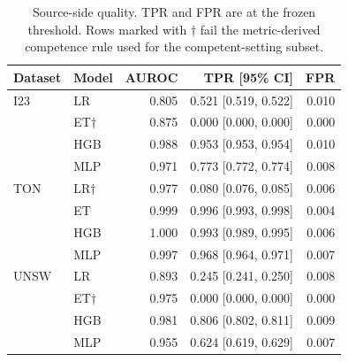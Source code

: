 \begin{table}[htbp]
\centering
\footnotesize
\setlength{\tabcolsep}{4pt}
\caption{Source-side quality. TPR and FPR are at the frozen \FrozenFprTarget{} threshold. Rows marked with $\dagger$ fail the metric-derived competence rule used for the competent-setting subset.}
\label{tab:source}
\begin{tabular}{llrrr}
\toprule
Dataset & Model & AUROC & TPR [95\% CI] & FPR \\
\midrule
I23 & LR & 0.805 & 0.521 [0.519, 0.522] & 0.010 \\
 & ET$\dagger$ & 0.875 & 0.000 [0.000, 0.000] & 0.000 \\
 & HGB & 0.988 & 0.953 [0.953, 0.954] & 0.010 \\
 & MLP & 0.971 & 0.773 [0.772, 0.774] & 0.008 \\
TON & LR$\dagger$ & 0.977 & 0.080 [0.076, 0.085] & 0.006 \\
 & ET & 0.999 & 0.996 [0.993, 0.998] & 0.004 \\
 & HGB & 1.000 & 0.993 [0.989, 0.995] & 0.006 \\
 & MLP & 0.997 & 0.968 [0.964, 0.971] & 0.007 \\
UNSW & LR & 0.893 & 0.245 [0.241, 0.250] & 0.008 \\
 & ET$\dagger$ & 0.975 & 0.000 [0.000, 0.000] & 0.000 \\
 & HGB & 0.981 & 0.806 [0.802, 0.811] & 0.009 \\
 & MLP & 0.955 & 0.624 [0.619, 0.629] & 0.007 \\
\bottomrule
\end{tabular}
\end{table}
